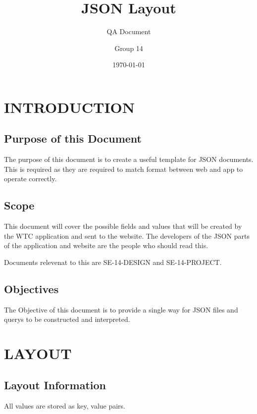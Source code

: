 \documentclass{project}
\begin{document}
\lstset{language=tex}
\title{JSON Layout}

\subtitle{QA Document}
\author{Group 14}     
\date{\today}

\maketitle
\tableofcontents
\newpage


\section{INTRODUCTION}

\subsection{Purpose of this Document}
The purpose of this document is to create a useful template for JSON documents.
This is required as they are required to match format between web and app to operate correctly.

\subsection{Scope}
This document will cover the possible fields and values that will be created by the WTC application
and sent to the website. The developers of the JSON parts of the application and website are the
people who should read this.

Documents relevenat to this are SE-14-DESIGN and SE-14-PROJECT.


\subsection{Objectives}
The Objective of this document is to provide a single way for JSON files and querys to be constructed
and interpreted.


\section{LAYOUT}

\subsection{Layout Information}
All values are stored as key, value pairs.
\end{document}
